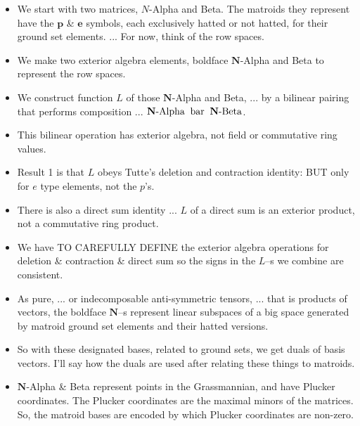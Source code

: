 \documentclass[14pt]{extarticle}
\begin{document}
{\bf
  \begin{itemize}
  \item We start with two matrices, $N$-Alpha and Beta.  The matroids
    they represent have the $\mathbf{p}$ \& $\mathbf{e}$ symbols, each
    exclusively hatted or
    not hatted, for their ground set elements. ...  For now, think of the
    row spaces.

  \item We make two exterior algebra elements,  boldface
    $\mathbf{N}$-Alpha and Beta to represent the row spaces.

  \item We construct function $L$ of those
    $\mathbf{N}$-Alpha and Beta, ... by a bilinear pairing 
    that performs composition ... 
  $\mathbf{N}\text{-Alpha} \text{\;\;bar\;\;} \mathbf{N}\text{-Beta}$.

  \item This bilinear operation has exterior algebra,
    not field or commutative ring values. 

\item Result 1 is that $L$ obeys Tutte's deletion and contraction identity:  BUT
  only for $e$ type elements, not the $p$'s.  

\item There is also a direct sum identity ... $L$ of a direct sum is an exterior product, not
  a commutative ring product.

\item We have TO CAREFULLY DEFINE the exterior algebra operations for deletion \&
  contraction \& direct sum so the signs in the $L$--s we combine are consistent.

\item
  As pure, ... or indecomposable anti-symmetric tensors, ... that is 
  products of vectors, the boldface
  $\mathbf{N}$--s represent linear subspaces of a big space generated
  by matroid ground set elements and their hatted versions.  

\item  So with these designated bases, related to ground sets, we get duals of basis vectors.
  I'll say how the duals are used after relating these things to matroids.

\item
  $\mathbf{N}$-Alpha \& Beta represent points in the
  Grassmannian, and have Plucker coordinates.
  The Plucker coordinates are the maximal minors of the matrices.
  So, the matroid bases are encoded by which Plucker coordinates are non-zero.


\end{itemize}}
\end{document}
